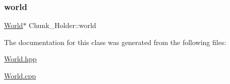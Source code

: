 \mbox{\label{classChunk__Holder_acc9696ef1450d475db150e000bc03c87}} 
\subsubsection{\texorpdfstring{world}{world}}
{\footnotesize\ttfamily \mbox{\hyperlink{classWorld}{World}}$\ast$ Chunk\+\_\+\+Holder\+::world\hspace{0.3cm}{\ttfamily [private]}}



The documentation for this class was generated from the following files\+:\begin{DoxyCompactItemize}
\item 
\mbox{\hyperlink{World_8hpp}{World.\+hpp}}\item 
\mbox{\hyperlink{World_8cpp}{World.\+cpp}}\end{DoxyCompactItemize}
